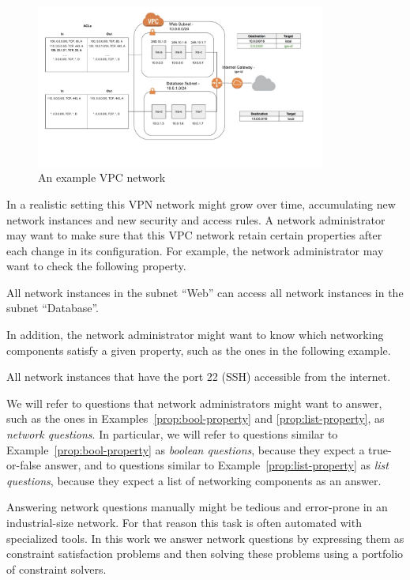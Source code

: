 \begin{figure}[th]
\centering\includegraphics[width=0.85\textwidth]{./aws/fig/vpc.pdf}
\caption{An example VPC network\label{ex:vpc}}
\end{figure}

In a realistic setting this VPN network might grow over time, accumulating new network instances and new security and access rules. A network administrator may want to make sure that this VPC network retain certain properties after each change in its configuration. For example, the network administrator may want to check the following property.
\begin{example}\label{prop:bool-property}
All network instances in the subnet ``Web'' can access all network instances in the subnet ``Database''.
\end{example}

In addition, the network administrator might want to know which networking components satisfy a given property, such as the ones in the following example.
\begin{example}\label{prop:list-property}
All network instances that have the port 22 (SSH) accessible from the internet.
\end{example}

We will refer to questions that network administrators might want to answer, such as the ones in Examples~\ref{prop:bool-property} and \ref{prop:list-property}, as \emph{network questions}. In particular, we will refer to questions similar to Example~\ref{prop:bool-property} as \emph{boolean questions}, because they expect a true-or-false answer, and to questions similar to Example~\ref{prop:list-property} as \emph{list questions}, because they expect a list of networking components as an answer.

%
%
Answering network questions manually might be tedious and error-prone in an industrial-size network. For that reason this task is often automated with specialized tools. In this work we answer network questions by expressing them as constraint satisfaction problems and then solving these problems using a portfolio of constraint solvers.

